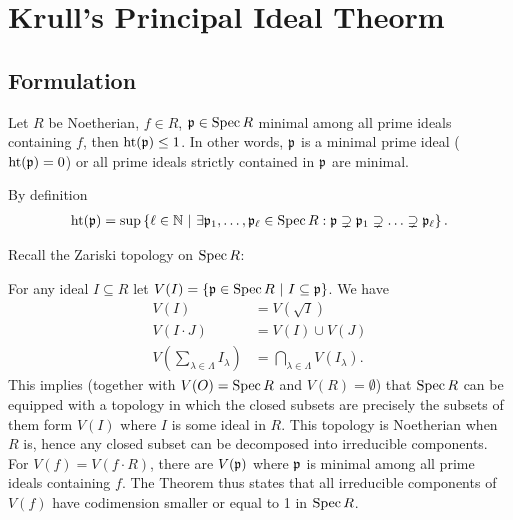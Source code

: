 \documentclass[a4paper,parskip=full,numbers=enddot]{scrreprt}
\begin{document}
\chapter{Krull's Principal Ideal Theorm}
\section{Formulation}
\begin{thm}
    Let $R$ be Noetherian, $f\in R$, $\mathfrak{p}\in \operatorname{Spec} R$ minimal among all prime ideals containing $f$, then $\operatorname{ht}(\mathfrak{p}) \leq 1$. In other words, $\mathfrak{p}$ is a minimal prime ideal ($\operatorname{ht}(\mathfrak{p}) =0$) or all prime ideals strictly contained in $\mathfrak{p}$ are minimal.
\end{thm}
\begin{rem*}
    \begin{alphanumerate}
    \item
        By definition
        \begin{align*}
            \operatorname{ht}(\mathfrak{p}) = \sup\left\{\ell\in\mathbb{N}\ \middle|\  \exists \mathfrak{p}_1,\ldots,\mathfrak{p}_\ell \in \operatorname{Spec} R: \mathfrak{p} \supsetneq\mathfrak{p}_1\supsetneq\ldots\supsetneq \mathfrak{p}_\ell\right\}.
        \end{align*}
    \item
        Recall the Zariski topology on $\operatorname{Spec} R$: 
        
        For any ideal $I\subseteq R$ let $V(I) = \left\{\mathfrak{p}\in\operatorname{Spec} R\ \middle|\  I\subseteq \mathfrak{p}\right\}$. We have 
        \begin{align*}
            V(I)& = V(\sqrt{I})\\
            V(I\cdot J ) &= V(I) \cup V(J)\\
            V\left(\sum_{\lambda\in\Lambda} I_\lambda\right) &= \bigcap_{\lambda\in\Lambda} V(I_\lambda).
        \end{align*}
        This implies (together with $V(O) = \operatorname{Spec} R$ and $V(R) = \emptyset$) that $\operatorname{Spec} R$ can be equipped with a topology in which the closed subsets are precisely the subsets of them form $V(I)$ where $I$ is some ideal in $R$. This topology is Noetherian when $R$ is, hence any closed subset can be decomposed into irreducible components. For $V(f) = V(f\cdot R)$, there are $V(\mathfrak{p})$ where $\mathfrak{p}$ is minimal among all prime ideals containing $f$. The Theorem  thus states that all irreducible components of $V(f)$ have codimension smaller or equal to 1 in $\operatorname{Spec} R$.
    \end{alphanumerate}
\end{rem*}

\printbibliography
\end{document}
